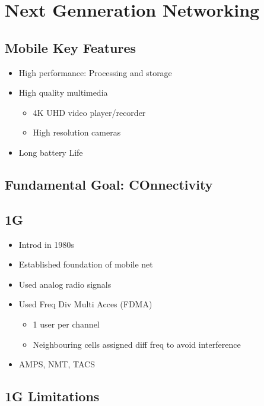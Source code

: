 \section{Next Genneration Networking}

\subsection{Mobile Key Features}

\begin{itemize}
	\item High performance: Processing and storage
	\item High quality multimedia
	\begin{itemize}
		\item 4K UHD video player/recorder
		\item High resolution cameras
	\end{itemize}
	\item Long battery Life
\end{itemize}

\subsection{Fundamental Goal: COnnectivity}

\subsection{1G}

\begin{itemize}
	\item Introd in 1980s
	\item Established foundation of mobile net
	\item Used analog radio signals
	\item Used Freq Div Multi Acces (FDMA)
	\begin{itemize}
		\item 1 user per channel
		\item Neighbouring cells assigned diff freq to avoid
			interference
	\end{itemize}
	\item AMPS, NMT, TACS
\end{itemize}

\subsection{1G Limitations}

